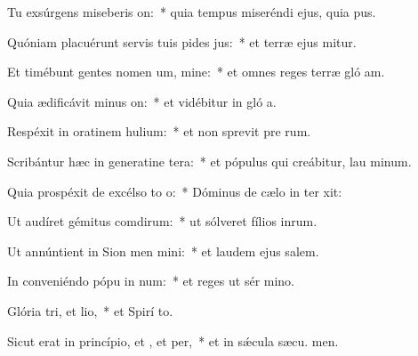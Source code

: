 \item Tu exsúrgens miseberis on:~* quia tempus miseréndi ejus, quia  pus.
\item Quóniam placuérunt servis tuis pides jus:~* et terræ ejus mitur.
\item Et timébunt gentes nomen um, mine:~* et omnes reges terræ gló am.
\item Quia ædificávit minus on:~* et vidébitur in gló a.
\item Respéxit in oratinem hulium:~* et non sprevit pre rum.
\item Scribántur hæc in generatine tera:~* et pópulus qui creábitur, lau minum.
\item Quia prospéxit de excélso to o:~* Dóminus de cælo in ter xit:
\item Ut audíret gémitus comdirum:~* ut sólveret fílios inrum.
\item Ut annúntient in Sion men mini:~* et laudem ejus  salem.
\item In conveniéndo pópu in num:~* et reges ut sér mino.
\item Glória tri, et lio,~* et Spirí to.
\item Sicut erat in princípio, et , et per,~* et in sǽcula sæcu. men.
